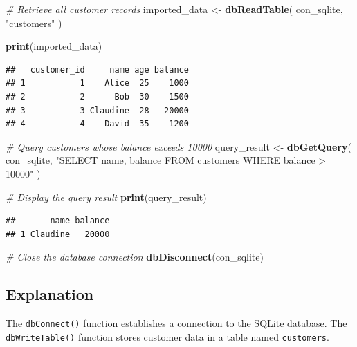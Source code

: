 \documentclass[
]{article}
\newenvironment{Shaded}{\begin{snugshade}}{\end{snugshade}}
\newcommand{\CommentTok}[1]{\textcolor[rgb]{0.56,0.35,0.01}{\textit{#1}}}
\newcommand{\FunctionTok}[1]{\textcolor[rgb]{0.13,0.29,0.53}{\textbf{#1}}}
\newcommand{\NormalTok}[1]{#1}
\newcommand{\OtherTok}[1]{\textcolor[rgb]{0.56,0.35,0.01}{#1}}
\newcommand{\StringTok}[1]{\textcolor[rgb]{0.31,0.60,0.02}{#1}}
\begin{document}
\begin{Shaded}
\begin{Highlighting}[]
\CommentTok{\# Retrieve all customer records}
\NormalTok{imported\_data }\OtherTok{\textless{}{-}} \FunctionTok{dbReadTable}\NormalTok{(}
\NormalTok{  con\_sqlite,}
  \StringTok{"customers"}
\NormalTok{)}

\FunctionTok{print}\NormalTok{(imported\_data)}
\end{Highlighting}
\end{Shaded}

\begin{verbatim}
##   customer_id     name age balance
## 1           1    Alice  25    1000
## 2           2      Bob  30    1500
## 3           3 Claudine  28   20000
## 4           4    David  35    1200
\end{verbatim}

\begin{Shaded}
\begin{Highlighting}[]
\CommentTok{\# Query customers whose balance exceeds 10000}
\NormalTok{query\_result }\OtherTok{\textless{}{-}} \FunctionTok{dbGetQuery}\NormalTok{(}
\NormalTok{  con\_sqlite,}
  \StringTok{"SELECT name, balance}
\StringTok{   FROM customers}
\StringTok{   WHERE balance \textgreater{} 10000"}
\NormalTok{)}

\CommentTok{\# Display the query result}
\FunctionTok{print}\NormalTok{(query\_result)}
\end{Highlighting}
\end{Shaded}

\begin{verbatim}
##       name balance
## 1 Claudine   20000
\end{verbatim}

\begin{Shaded}
\begin{Highlighting}[]
\CommentTok{\# Close the database connection}
\FunctionTok{dbDisconnect}\NormalTok{(con\_sqlite)}
\end{Highlighting}
\end{Shaded}

\subsection{Explanation}\label{explanation-2}

The \texttt{dbConnect()} function establishes a connection to the SQLite
database. The \texttt{dbWriteTable()} function stores customer data in a
table named \texttt{customers}.
\end{document}
